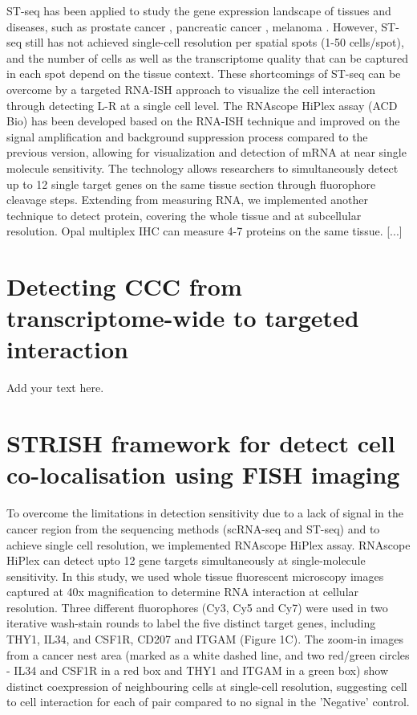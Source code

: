  ST-seq has been applied to study the gene expression landscape of tissues and diseases, such as prostate cancer    \cite{berglund2018spatial, ji2020multimodal}, pancreatic cancer \cite{moncada2019integrating}, melanoma \cite{thrane2018spatially}. However, ST-seq still has not achieved single-cell resolution per spatial spots (1-50 cells/spot), and the number of cells as well as the transcriptome quality that can be captured in each spot depend on the tissue context. These shortcomings of ST-seq can be overcome by a targeted RNA-ISH approach to visualize the cell interaction through detecting L-R at a single cell level. The RNAscope HiPlex assay (ACD Bio) has been developed based on the RNA-ISH technique and improved on the signal amplification and background suppression process compared to the previous version, allowing for visualization and detection of mRNA at near single molecule sensitivity. The technology allows researchers to simultaneously detect up to 12 single target genes on the same tissue section through fluorophore cleavage steps. Extending from measuring RNA, we implemented another technique to detect protein, covering the whole tissue and at subcellular resolution. Opal multiplex IHC can measure 4-7 proteins on the same tissue. [...]
\section{Detecting CCC from transcriptome-wide to targeted interaction}
\label{Sec:2.2_CCC_ST}	%

Add your text here. 

\section{STRISH framework for detect cell co-localisation using FISH imaging}
\label{Sec:2.2_STRISH}	%

To overcome the limitations in detection sensitivity due to a lack of signal in the cancer region from the sequencing methods (scRNA-seq and ST-seq) and to achieve single cell resolution, we implemented RNAscope HiPlex assay. RNAscope HiPlex can detect upto 12 gene targets simultaneously at single-molecule sensitivity. In this study, we used whole tissue fluorescent microscopy images captured at 40x magnification to determine RNA interaction at cellular resolution. Three different fluorophores (Cy3, Cy5 and Cy7) were used in two iterative wash-stain rounds to label the five distinct target genes, including THY1, IL34, and CSF1R, CD207 and ITGAM (Figure 1C). The zoom-in images from a cancer nest area (marked as a white dashed line, and two red/green circles - IL34 and CSF1R in a red box and THY1 and ITGAM in a green box) show distinct coexpression of neighbouring cells at single-cell resolution, suggesting cell to cell interaction for each of pair compared to no signal in the 'Negative' control. 


